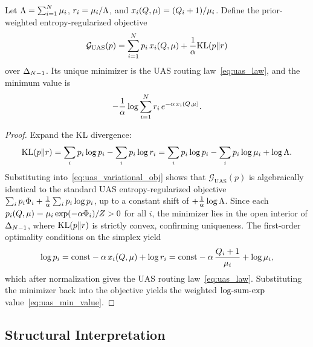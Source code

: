 \begin{proposition}
\label{prop:uas_variational}
Let $\Lambda = \sum_{i=1}^{N} \mu_i$, $r_{i} = \mu_i / \Lambda$, and $x_{i}(Q, \mu) = (Q_{i}+1)/\mu_i$. Define the prior-weighted entropy-regularized objective
\begin{equation}
\label{eq:uas_variational_obj}
\mathcal{G}_{\mathrm{UAS}}(p) = \sum_{i=1}^{N} p_i\, x_{i}(Q, \mu) + \frac{1}{\alpha}\mathrm{KL}(p\|r)
\end{equation}
over $\Delta_{N-1}$. Its unique minimizer is the UAS routing law~\eqref{eq:uas_law}, and the minimum value is
\begin{equation}
\label{eq:uas_min_value}
-\frac{1}{\alpha}\log \sum_{i=1}^{N} r_{i}\, e^{-\alpha\, x_{i}(Q, \mu)}.
\end{equation}
\end{proposition}

\begin{proof}
Expand the KL divergence:
\begin{equation}
\label{eq:kl_expansion}
\mathrm{KL}(p\|r) = \sum_i p_i \log p_i - \sum_i p_i \log r_{i}
= \sum_i p_i \log p_i - \sum_i p_i \log \mu_i + \log \Lambda.
\end{equation}
Substituting into~\eqref{eq:uas_variational_obj} shows that $\mathcal{G}_{\mathrm{UAS}}(p)$ is algebraically identical to the standard UAS entropy-regularized objective $\sum_i p_i \Phi_{i} + \frac{1}{\alpha} \sum_i p_i \log p_i$, up to a constant shift of $+\frac{1}{\alpha}\log\Lambda$. Since each $p_i(Q,\mu) = \mu_i \exp(-\alpha\Phi_{i})/Z > 0$ for all $i$, the minimizer lies in the open interior of $\Delta_{N-1}$, where $\mathrm{KL}(p\|r)$ is strictly convex, confirming uniqueness. The first-order optimality conditions on the simplex yield
\begin{equation}
\label{eq:uas_foc}
\log p_i = \mathrm{const} - \alpha\, x_{i}(Q, \mu) + \log r_{i}
= \mathrm{const} - \alpha\, \frac{Q_{i}+1}{\mu_i} + \log \mu_i,
\end{equation}
which after normalization gives the UAS routing law~\eqref{eq:uas_law}. Substituting the minimizer back into the objective yields the weighted $\mathrm{log\text{-}sum\text{-}exp}$ value~\eqref{eq:uas_min_value}.
\end{proof}

\subsection{Structural Interpretation}
\label{sec:uas:interpretation}

